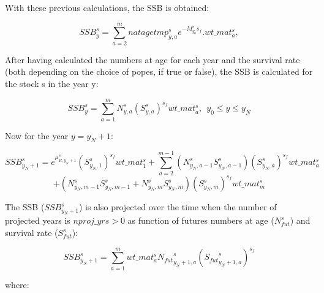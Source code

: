 \documentclass{article}
\begin{document}
With these previous calculations, the SSB is obtained:

\begin{equation}
    SSB^s_y=\sum_{a=2}^{m}natagetmp^s_{y,a}e^{-M^s_{y_0}s_f}.wt\_{mat}^s_a,
\end{equation}


After having calculated the numbers at age for each year and the survival rate (both depending on the choice of popes, if true or false), the SSB is calculated for the stock s in the year y:

\begin{equation}
SSB^s_y=\sum_{a=1}^{m}N^s_{y,a}{(S^s_{y,a})}^{s_f}{wt\_{mat}}^s_a, \ \ y_0 \leq y \leq y_N
\end{equation}


Now for the year $y=y_N+1$:

\begin{equation}
    SSB^s_{y_N+1}=e^{\mu^s_{R,y_N+1}}(S^{s}_{y_N,1})^{s_f}{wt\_{mat}}^s_1+\sum_{a=2}^{m-1}(N^{s}_{y_N,a-1}S^{s}_{y_N,a-1})(S^s_{y_N,a})^{s_f}wt\_{mat}^s_a
\end{equation}
\begin{equation*}
 +(N^{s}_{y_N,m-1}S^s_{y_N,m-1}+N^s_{y_N,m}S^s_{y_N,m})(S^s_{y_N,m})^{s_f}wt\_{mat}^s_{m}
\end{equation*}

The SSB ($SSB^s_{y_N+1}$) is also projected over the time when the number of projected years is $nproj\_yrs>0$ as function of futures numbers at age ($N^s_{fut}$) and survival rate ($S^s_{fut}$): 

\begin{equation}
    SSB^s_{y_N+1}= \sum_{a=1}^m wt\_{mat}^s_a{N_{fut}}^s_{y_N+1,a}({{S_{fut}}^s_{y_N+1,a}})^{s_f}
\end{equation}

where: 
\end{document}
